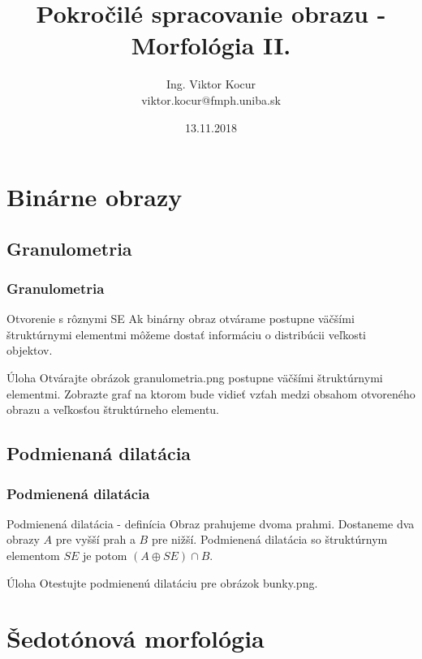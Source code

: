 \documentclass{beamer}
\title[8. cvičenie]{Pokročilé spracovanie obrazu - Morfológia II.}
\author[Kocur]{Ing. Viktor Kocur \\{\small viktor.kocur@fmph.uniba.sk}}
\institute{DAI FMFI UK}
\date{13.11.2018}
\begin{document}

\begin{frame}
  \titlepage
\end{frame}

\section{Binárne obrazy}
\subsection{Granulometria}

\begin{frame}
\frametitle{Granulometria}
  \begin{block}{Otvorenie s rôznymi SE}
  Ak binárny obraz otvárame postupne väčšími štruktúrnymi elementmi môžeme dostať informáciu o distribúcii veľkosti objektov.
  \end{block}
  

  \begin{block}{Úloha}
  Otvárajte obrázok granulometria.png postupne väčšími štruktúrnymi elementmi. Zobrazte graf na ktorom bude vidieť vzťah medzi obsahom otvoreného obrazu a veľkosťou štruktúrneho elementu.
  \end{block}
\end{frame}

\subsection{Podmienaná dilatácia}

\begin{frame}
\frametitle{Podmienená dilatácia}
  \begin{block}{Podmienená dilatácia - definícia}
  Obraz prahujeme dvoma prahmi. Dostaneme dva obrazy $A$ pre vyšší prah a $B$ pre nižší. Podmienená dilatácia so štruktúrnym elementom $SE$ je potom $(A \oplus SE) \cap B$.
  \end{block}  

  \begin{block}{Úloha}
  Otestujte podmienenú dilatáciu pre obrázok bunky.png.
  \end{block}
\end{frame}

\section{Šedotónová morfológia}
\end{document}
